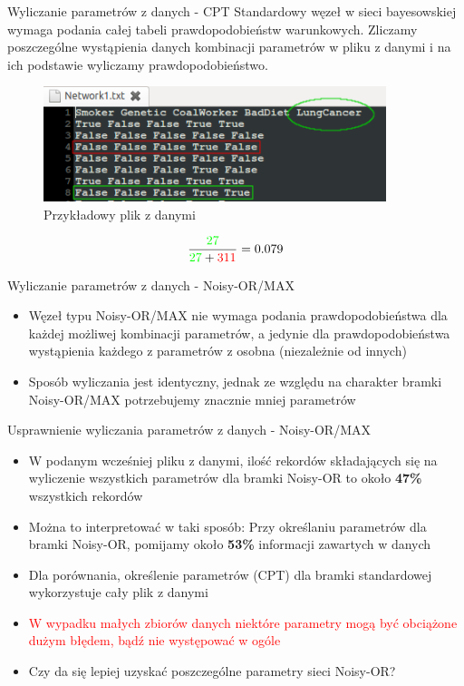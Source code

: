 \documentclass{beamer}
\begin{document}
\begin{frame}{Wyliczanie parametrów z danych - CPT}
	Standardowy węzeł w sieci bayesowskiej wymaga podania całej tabeli prawdopodobieństw warunkowych. 
	Zliczamy poszczególne wystąpienia danych kombinacji parametrów w pliku z danymi i na ich podstawie wyliczamy prawdopodobieństwo.

	\begin{figure}[h!]
		\centering
		\includegraphics[width=10cm]{4.png}
		\caption{Przykładowy plik z danymi}
	\end{figure}
	\begin{equation}
	\frac{\textcolor{green}{27}}{\textcolor{green}{27} + \textcolor{red}{311}} = 0.079
	\end{equation}
\end{frame}	
\begin{frame}{Wyliczanie parametrów z danych - Noisy-OR/MAX}
	\begin{itemize}
		\item Węzeł typu Noisy-OR/MAX nie wymaga podania prawdopodobieństwa dla każdej możliwej kombinacji parametrów, a jedynie dla prawdopodobieństwa wystąpienia każdego z parametrów z osobna (niezależnie od innych)
		\item Sposób wyliczania jest identyczny, jednak ze względu na charakter bramki Noisy-OR/MAX potrzebujemy znacznie mniej parametrów
	\end{itemize}
\end{frame}

\begin{frame}{Usprawnienie wyliczania parametrów z danych - Noisy-OR/MAX}
	\begin{itemize}
		\item W podanym wcześniej pliku z danymi, ilość rekordów składających się na wyliczenie wszystkich parametrów dla bramki Noisy-OR to około \textbf{47\%} wszystkich rekordów
		\item Można to interpretować w taki sposób: Przy określaniu parametrów dla bramki Noisy-OR, pomijamy około \textbf{53\%} informacji zawartych w danych
		\item Dla porównania, określenie parametrów (CPT) dla bramki standardowej wykorzystuje cały plik z danymi
        \pause \item \textcolor{red}{W wypadku małych zbiorów danych niektóre parametry mogą być obciążone dużym błędem, bądź nie występować w ogóle}
		\pause \item Czy da się lepiej uzyskać poszczególne parametry sieci Noisy-OR?
	\end{itemize}
\end{frame}
\end{document}
